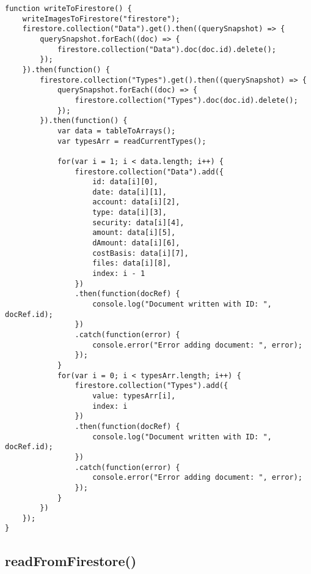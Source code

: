 \documentclass[letterpaper]{article}
\begin{document}
\begin{lstlisting}[firstnumber=75]
function writeToFirestore() {
    writeImagesToFirestore("firestore");
    firestore.collection("Data").get().then((querySnapshot) => {
        querySnapshot.forEach((doc) => {
            firestore.collection("Data").doc(doc.id).delete();
        });
    }).then(function() {
        firestore.collection("Types").get().then((querySnapshot) => {
            querySnapshot.forEach((doc) => {
                firestore.collection("Types").doc(doc.id).delete();
            });
        }).then(function() {
            var data = tableToArrays();
            var typesArr = readCurrentTypes();

            for(var i = 1; i < data.length; i++) {
                firestore.collection("Data").add({
                    id: data[i][0],
                    date: data[i][1],
                    account: data[i][2],
                    type: data[i][3],
                    security: data[i][4],
                    amount: data[i][5],
                    dAmount: data[i][6],
                    costBasis: data[i][7],
                    files: data[i][8],
                    index: i - 1
                })
                .then(function(docRef) {
                    console.log("Document written with ID: ", docRef.id);
                })
                .catch(function(error) {
                    console.error("Error adding document: ", error);
                });
            }
            for(var i = 0; i < typesArr.length; i++) {
                firestore.collection("Types").add({
                    value: typesArr[i],
                    index: i
                })
                .then(function(docRef) {
                    console.log("Document written with ID: ", docRef.id);
                })
                .catch(function(error) {
                    console.error("Error adding document: ", error);
                });
            }
        })
    });
}
\end{lstlisting}

\subsection{readFromFirestore()}
\end{document}
